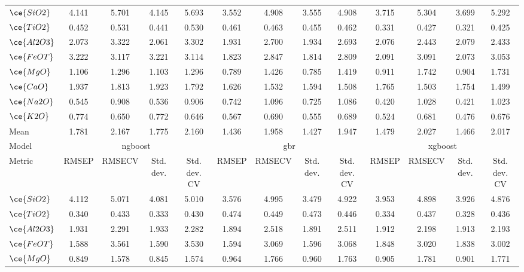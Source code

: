 \begin{table*}[]
{\begin{tabular}{l|cccc|cccc|cccc}
\hline
$\ce{SiO2}$ & 4.141 & 5.701 & 4.145 & 5.693 & 3.552 & 4.908 & 3.555 & 4.908 & 3.715 & 5.304 & 3.699 & 5.292 \\
$\ce{TiO2}$ & 0.452 & 0.531 & 0.441 & 0.530 & 0.461 & 0.463 & 0.455 & 0.462 & 0.331 & 0.427 & 0.321 & 0.425 \\
$\ce{Al2O3}$ & 2.073 & 3.322 & 2.061 & 3.302 & 1.931 & 2.700 & 1.934 & 2.693 & 2.076 & 2.443 & 2.079 & 2.433 \\
$\ce{FeOT}$ & 3.222 & 3.117 & 3.221 & 3.114 & 1.823 & 2.847 & 1.814 & 2.809 & 2.091 & 3.091 & 2.073 & 3.053 \\
$\ce{MgO}$ & 1.106 & 1.296 & 1.103 & 1.296 & 0.789 & 1.426 & 0.785 & 1.419 & 0.911 & 1.742 & 0.904 & 1.731 \\
$\ce{CaO}$ & 1.937 & 1.813 & 1.923 & 1.792 & 1.626 & 1.532 & 1.594 & 1.508 & 1.765 & 1.503 & 1.754 & 1.499 \\
$\ce{Na2O}$ & 0.545 & 0.908 & 0.536 & 0.906 & 0.742 & 1.096 & 0.725 & 1.086 & 0.420 & 1.028 & 0.421 & 1.023 \\
$\ce{K2O}$ & 0.774 & 0.650 & 0.772 & 0.646 & 0.567 & 0.690 & 0.555 & 0.689 & 0.524 & 0.681 & 0.476 & 0.676 \\
\hline
Mean & 1.781 & 2.167 & 1.775 & 2.160 & 1.436 & 1.958 & 1.427 & 1.947 & 1.479 & 2.027 & 1.466 & 2.017 \\
\hline
Model & \multicolumn{4}{c}{\gls{ngboost}} & \multicolumn{4}{c}{\gls{gbr}} & \multicolumn{4}{c}{\gls{xgboost}} \\
Metric & \multicolumn{1}{c}{RMSEP} & \multicolumn{1}{c}{RMSECV} & \multicolumn{1}{c}{Std. dev.} & \multicolumn{1}{c}{Std. dev. CV} & \multicolumn{1}{c}{RMSEP} & \multicolumn{1}{c}{RMSECV} & \multicolumn{1}{c}{Std. dev.} & \multicolumn{1}{c}{Std. dev. CV} & \multicolumn{1}{c}{RMSEP} & \multicolumn{1}{c}{RMSECV} & \multicolumn{1}{c}{Std. dev.} & \multicolumn{1}{c}{Std. dev. CV} \\
\hline
$\ce{SiO2}$ & 4.112 & 5.071 & 4.081 & 5.010 & 3.576 & 4.995 & 3.479 & 4.922 & 3.953 & 4.898 & 3.926 & 4.876 \\
$\ce{TiO2}$ & 0.340 & 0.433 & 0.333 & 0.430 & 0.474 & 0.449 & 0.473 & 0.446 & 0.334 & 0.437 & 0.328 & 0.436 \\
$\ce{Al2O3}$ & 1.931 & 2.291 & 1.933 & 2.282 & 1.894 & 2.518 & 1.891 & 2.511 & 1.912 & 2.198 & 1.913 & 2.193 \\
$\ce{FeOT}$ & 1.588 & 3.561 & 1.590 & 3.530 & 1.594 & 3.069 & 1.596 & 3.068 & 1.848 & 3.020 & 1.838 & 3.002 \\
$\ce{MgO}$ & 0.849 & 1.578 & 0.845 & 1.574 & 0.964 & 1.766 & 0.960 & 1.763 & 0.905 & 1.781 & 0.901 & 1.771 \\

\end{tabular}}
\end{table*}
